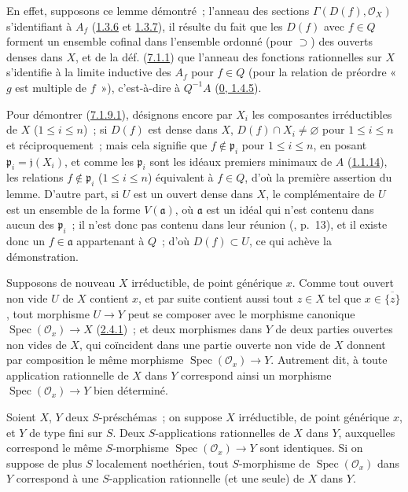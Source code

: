 En effet, supposons ce lemme démontré~; l'anneau des sections
$\Gamma(D(f),\mathscr{O}_X)$ s'identifiant à $A_f$
(\hyperref[I.1.3.6-fr]{1.3.6} et \hyperref[I.1.3.7-fr]{1.3.7}), il résulte du
fait que les $D(f)$ avec $f\in Q$ forment un ensemble cofinal dans l'ensemble
ordonné (pour $\supset$) des ouverts denses dans $X$, et de la déf.
(\hyperref[I.7.1.1-fr]{7.1.1}) que l'anneau des fonctions rationnelles sur $X$
s'identifie à la limite inductive des $A_f$ pour $f\in Q$ (pour la relation de
préordre «~$g$ est multiple de $f$~»), c'est-à-dire à $Q^{-1}A$
(\hyperref[0.1.4.5-fr]{0, 1.4.5}).

Pour démontrer (\hyperref[I.7.1.9.1-fr]{7.1.9.1}), désignons encore par $X_i$
les composantes irréductibles de $X$ ($1\leq i\leq n$)~; si $D(f)$ est dense
dans $X$, $D(f)\cap X_i\neq\varnothing$ pour $1\leq i\leq n$ et
réciproquement~; mais cela signifie que $f\notin\mathfrak{p}_i$ pour
$1\leq i\leq n$, en posant $\mathfrak{p}_i=\mathfrak{j}(X_i)$, et comme les
$\mathfrak{p}_i$ sont les idéaux premiers minimaux de $A$
(\hyperref[I.1.1.14-fr]{1.1.14}), les relations
$f\notin\mathfrak{p}_i$ ($1\leq i\leq n$) équivalent à $f\in Q$, d'où la
première assertion du lemme. D'autre part, si $U$ est un ouvert dense dans $X$,
le complémentaire de $U$ est un ensemble de la forme $V(\mathfrak{a})$, où
$\mathfrak{a}$ est un idéal qui n'est contenu dans aucun des $\mathfrak{p}_i$~;
il n'est donc pas contenu dans leur réunion (\cite{I-10}, p.~13), et il existe
donc un $f\in\mathfrak{a}$ appartenant à $Q$~; d'où $D(f)\subset U$, ce qui
achève la démonstration.

\begin{env}[7.1.10]
\label{I.7.1.10-fr}
Supposons de nouveau $X$ irréductible, de point générique $x$. Comme tout
ouvert non vide $U$ de $X$ contient $x$, et par suite contient aussi tout
$z\in X$ tel que $x\in\overline{\{z\}}$, tout morphisme $U\to Y$ peut se
composer avec le morphisme canonique $\operatorname{Spec}(\mathscr{O}_x)\to X$
(\hyperref[I.2.4.1-fr]{2.4.1})~; et deux morphismes dans $Y$ de deux parties
ouvertes non vides de $X$, qui coïncident dans une partie ouverte non vide de
$X$ donnent par composition le même morphisme
$\operatorname{Spec}(\mathscr{O}_x)\to Y$. Autrement dit, à toute application
rationnelle de $X$ dans $Y$ correspond ainsi un morphisme
$\operatorname{Spec}(\mathscr{O}_x)\to Y$ bien déterminé.
\end{env}

\begin{proposition}[7.1.11]
\label{I.7.1.11-fr}
Soient $X$, $Y$ deux $S$-préschémas~; on suppose $X$ irréductible, de point
générique $x$, et $Y$ de type fini sur $S$. Deux $S$-applications rationnelles
de $X$ dans $Y$, auxquelles correspond le même $S$-morphisme
$\operatorname{Spec}(\mathscr{O}_x)\to Y$ sont identiques. Si on suppose de
plus $S$ localement noethérien, tout $S$-morphisme de
$\operatorname{Spec}(\mathscr{O}_x)$ dans $Y$ correspond à une $S$-application
rationnelle (et une seule) de $X$ dans $Y$.
\end{proposition}

